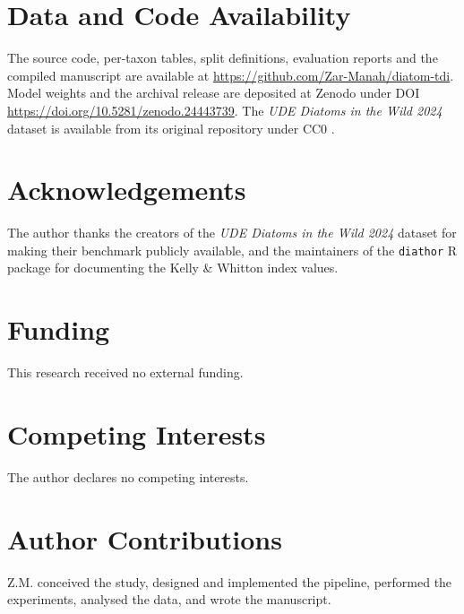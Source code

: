 \documentclass[10pt,twocolumn,a4paper]{article}
\begin{document}
\section*{Data and Code Availability}
The source code, per-taxon tables, split definitions, evaluation reports and the compiled manuscript are available at \url{https://github.com/Zar-Manah/diatom-tdi}. Model weights and the archival release are deposited at Zenodo under DOI \url{https://doi.org/10.5281/zenodo.24443739}. The \textit{UDE Diatoms in the Wild 2024} dataset is available from its original repository under CC0 \cite{venkataramanan2024ude}.

\section*{Acknowledgements}
The author thanks the creators of the \textit{UDE Diatoms in the Wild 2024} dataset for making their benchmark publicly available, and the maintainers of the \texttt{diathor} R package for documenting the Kelly \& Whitton index values.

\section*{Funding}
This research received no external funding.

\section*{Competing Interests}
The author declares no competing interests.

\section*{Author Contributions}
Z.M. conceived the study, designed and implemented the pipeline, performed the experiments, analysed the data, and wrote the manuscript.
\end{document}
